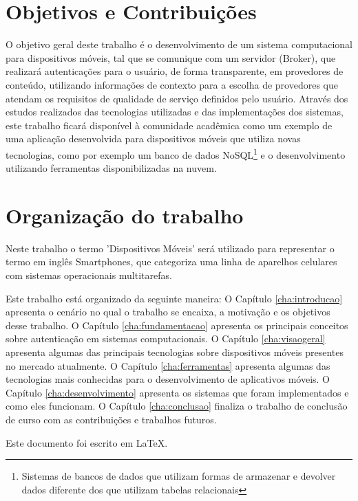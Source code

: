 \section{Objetivos e Contribuições}
O objetivo geral deste trabalho é o desenvolvimento de um sistema computacional para dispositivos móveis, tal que se comunique com um servidor (Broker), que realizará autenticações para o usuário, de forma transparente, em provedores de conteúdo, utilizando informações de contexto para a escolha de provedores que atendam os requisitos de qualidade de serviço definidos pelo usuário.
Através dos estudos realizados das tecnologias utilizadas e das implementações dos sistemas, este trabalho ficará disponível à comunidade acadêmica como um exemplo de uma aplicação desenvolvida para dispositivos móveis que utiliza novas tecnologias, como por exemplo um banco de dados NoSQL\footnote{Sistemas de bancos de dados que utilizam formas de armazenar e devolver dados diferente dos que utilizam tabelas relacionais} e o desenvolvimento utilizando ferramentas disponibilizadas na nuvem.

\section{Organização do trabalho}
Neste trabalho o termo 'Dispositivos Móveis' será utilizado para representar o termo em inglês Smartphones, que categoriza uma linha de aparelhos celulares com sistemas operacionais multitarefas.

Este trabalho está organizado da seguinte maneira: O Capítulo \ref{cha:introducao} apresenta o cenário no qual o trabalho se encaixa, a motivação e os objetivos desse trabalho. O Capítulo \ref{cha:fundamentacao} apresenta os principais conceitos sobre autenticação em sistemas computacionais. O Capítulo \ref{cha:visaogeral} apresenta algumas das principais tecnologias sobre dispositivos móveis presentes no mercado atualmente. O Capítulo \ref{cha:ferramentas} apresenta algumas das tecnologias mais conhecidas para o desenvolvimento de aplicativos móveis. O Capítulo \ref{cha:desenvolvimento} apresenta os sistemas que foram implementados e como eles funcionam. O Capítulo \ref{cha:conclusao} finaliza o trabalho de conclusão de curso com as contribuições e trabalhos futuros.

Este documento foi escrito em \LaTeX.